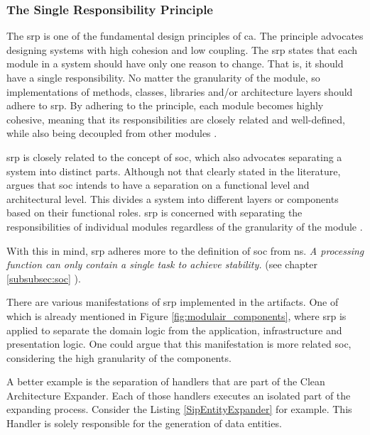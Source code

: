 \subsubsection*{The Single Responsibility Principle} \label{subsubsec:srp}

The \gls{srp} is one of the fundamental design principles of \gls{ca}. The principle
advocates designing systems with high cohesion and low coupling. The \gls{srp} states that
each module in a system should have only one reason to change. That is, it should have a
single responsibility. No matter the granularity of the module, so implementations of
methods, classes, libraries and/or architecture layers should adhere to \gls{srp}. By
adhering to the principle, each module becomes highly cohesive, meaning that its
responsibilities are closely related and well-defined, while also being decoupled from
other modules \parencite[81]{robert_c_martin_clean_2018}.

\gls{srp} is closely related to the concept of \gls{soc}, which also advocates separating
a system into distinct parts. Although not that clearly stated in the literature,
\citeauthor{robert_c_martin_clean_2018} argues that \gls{soc} intends to have a separation
on a functional level and architectural level. This divides a system into different layers
or components based on their functional roles. \gls{srp} is concerned with separating the
responsibilities of individual modules regardless of the granularity of the module
\parencite[205]{robert_c_martin_clean_2018}.

With this in mind, \gls{srp} adheres more to the definition of \gls{soc} from \gls{ns}.
\textit{A processing function can only contain a single task to achieve stability.} (see
chapter \ref{subsubsec:soc} ).

There are various manifestations of \gls{srp} implemented in the artifacts. One of which is
already mentioned in Figure \ref{fig:modulair_components}, where \gls{srp} is applied to
separate the domain logic from the application, infrastructure and presentation logic. One
could argue that this manifestation is more related \gls{soc}, considering the high
granularity of the components.

A better example is the separation of handlers that are part of the Clean Architecture
Expander. Each of those handlers executes an isolated part of the expanding process.
Consider the Listing \ref{SipEntityExpander} 
\parencite{koks_expandentitieshandlerinteractor_2023} for example. This Handler is solely
responsible for the generation of data entities. 

